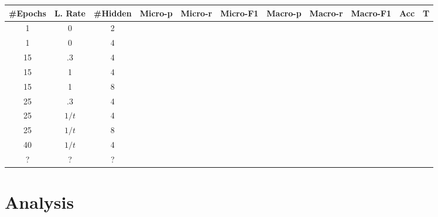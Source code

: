 \documentclass{article}
\begin{document}
\begin{center}
  \begin{tabular}{| c | c | c | c | c | c | c | c | c | c | c |}
    \hline
\#Epochs & L. Rate & \#Hidden & Micro-p & Micro-r & Micro-F1 & Macro-p & Macro-r & Macro-F1 & Acc & T \\ \hline
1 & 0 & 2 & & & & & & & & \\ \hline
1 & 0 & 4 & & & & & & & & \\ \hline
15 & .3 & 4 & & & & & & & & \\ \hline
15 & 1 & 4 & & & & & & & & \\ \hline
15 & 1 & 8 & & & & & & & & \\ \hline
25 & .3 & 4 & & & & & & & & \\ \hline
25 & $1/t$ & 4 & & & & & & & & \\ \hline
25 & $1/t$ & 8 & & & & & & & & \\ \hline
40 & $1/t$ & 4 & & & & & & & & \\ \hline
? & ? & ? & & & & & & & & \\ \hline
  \end{tabular}
\end{center}


\section{Analysis}
\end{document}
